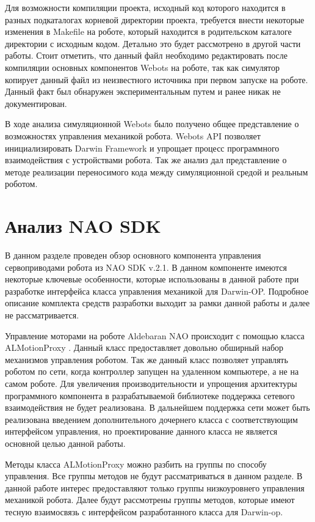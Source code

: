 
Для возможности компиляции проекта, исходный код которого находится в разных подкаталогах корневой директории проекта, требуется внести некоторые изменения в Makefile на роботе, который находится в родительском каталоге директории с исходным кодом. Детально это будет рассмотрено в другой части работы. Стоит отметить, что данный файл необходимо редактировать после компиляции основных компонентов Webots на роботе, так как симулятор копирует данный файл из неизвестного источника при первом запуске на роботе. Данный факт был обнаружен экспериментальным путем и ранее никак не документирован.

В ходе анализа симуляционной Webots было получено общее представление о возможностях управления механикой робота. Webots API позволяет инициализировать Darwin Framework и упрощает процесс программного взаимодействия с устройствами робота. Так же анализ дал представление о методе реализации переносимого кода между симуляционной средой и реальным роботом.

\section{Анализ NAO SDK}

В данном разделе проведен обзор основного компонента управления сервоприводами робота из NAO SDK v.2.1. В данном компоненте имеются некоторые ключевые особенности, которые использованы в данной работе при разработке интерфейса класса управления механикой для Darwin-OP. Подробное описание комплекта средств разработки выходит за рамки данной работы и далее не рассматривается.

Управление моторами на роботе Aldebaran NAO происходит с помощью класса ALMotionProxy \cite{urlalmotion}. Данный класс предоставляет довольно обширный набор механизмов управления роботом. Так же данный класс позволяет управлять роботом по сети, когда контроллер запущен на удаленном компьютере, а не на самом роботе. Для увеличения производительности и упрощения архитектуры программного компонента в разрабатываемой библиотеке поддержка сетевого взаимодействия не будет реализована. В дальнейшем поддержка сети может быть реализована введением дополнительного дочернего класса с соответствующим интерфейсом управления, но проектирование данного класса не является основной целью данной работы.

Методы класса ALMotionProxy можно разбить на группы по способу управления. Все группы методов не будут рассматриваться в данном разделе. В данной работе интерес предоставляют только группы низкоуровнего управления механикой робота. Далее будут рассмотрены группы методов, которые имеют тесную взаимосвязь с интерфейсом разработанного класса для Darwin-op.

